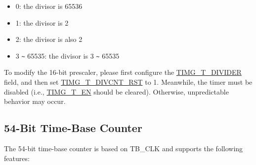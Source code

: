 \documentclass[main\_\_EN.tex]{subfiles}
\begin{document}
\begin{itemize}
    \begin{itemize}
        \item 0: the divisor is 65536
        \item 1: the divisor is 2
        \item 2: the divisor is also 2
        \item 3 \verb+~+ 65535: the divisor is 3 \verb+~+ 65535
    \end{itemize}

    To modify the 16-bit prescaler, please first configure the \hyperref[fielddesc:TIMGTXDIVIDER]{TIMG\_T\_DIVIDER} field, and then set \hyperref[fielddesc:TIMGTXDIVCNTRST]{TIMG\_T\_DIVCNT\_RST} to 1. Meanwhile, the timer must be disabled (i.e., \hyperref[fielddesc:TIMGTXEN]{TIMG\_T\_EN} should be cleared). Otherwise, unpredictable behavior may occur.

\end{itemize}


\subsection{54-Bit Time-Base Counter}

The 54-bit time-base counter is based on TB\_CLK and supports the following features:
\end{document}
